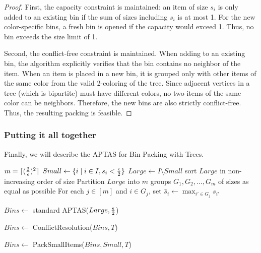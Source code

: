 \begin{proof}
First, the capacity constraint is maintained: an item of size $s_i$ is only added to an existing bin if the sum of sizes including $s_i$ is at most 1. For the new color-specific bins, a fresh bin is opened if the capacity would exceed 1. Thus, no bin exceeds the size limit of 1.

Second, the conflict-free constraint is maintained. When adding to an existing bin, the algorithm explicitly verifies that the bin contains no neighbor of the item. When an item is placed in a new bin, it is grouped only with other items of the same color from the valid 2-coloring of the tree. Since adjacent vertices in a tree (which is bipartite) must have different colors, no two items of the same color can be neighbors. Therefore, the new bins are also strictly conflict-free. Thus, the resulting packing is feasible.
\end{proof}

\subsubsection*{Putting it all together}
Finally, we will describe the APTAS for Bin Packing with Trees.
\begin{algorithm}
  \caption{APTAS for Bin Packing with Trees}
  \begin{algorithmic}[1]
    \State $m = \lceil (\frac{2}{\epsilon})^2 \rceil$
    \State $Small \gets \{i \mid i \in I, s_i < \frac{\epsilon}{2}\}$
    \State $Large \gets I \setminus Small$
    \State sort $Large$ in non-increasing order of size
    \State Partition $Large$ into $m$ groups $G_1, G_2, \ldots, G_m$ of sizes as equal as possible
    \State For each $j \in [m]$ and $i \in G_j$, set $\hat{s}_i \gets \max_{i' \in G_j} s_{i'}$

    \State $Bins \gets$ standard APTAS($Large, \frac{\epsilon}{2}$)

    \State $Bins \gets$ ConflictResolution($Bins, T$)

    \State $Bins \gets$ PackSmallItems($Bins, Small, T$)

    \EndProcedure
  \end{algorithmic}
\end{algorithm}


